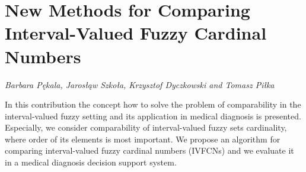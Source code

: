 \documentclass[../booklet.tex]{subfiles}
\begin{document}
\section[New Methods for Comparing Interval-Valued Fuzzy Cardinal Numbers. {\it Barbara Pękala, Jarosłąw Szkoła, Krzysztof Dyczkowski and Tomasz Piłka}]{New Methods for Comparing Interval-Valued Fuzzy Cardinal Numbers}
   

\begin{center}
  {\it Barbara Pękala, Jarosłąw Szkoła, Krzysztof Dyczkowski and Tomasz Piłka}
\end{center}

\vskip 0.8cm


In this contribution the concept how to solve the problem of comparability in the interval-valued fuzzy setting and its application in medical diagnosis is presented. Especially, we consider comparability of interval-valued fuzzy sets cardinality, where order of its elements is most important.  We propose an algorithm for comparing interval-valued fuzzy cardinal numbers (IVFCNs) and we evaluate it in a medical diagnosis decision support system.

\end{document}

